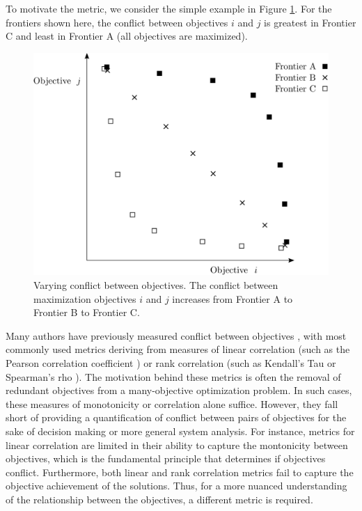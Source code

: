 To motivate the metric, we consider the simple example in Figure \ref{fig:ConflictVariesExample}. For the frontiers shown here, the conflict between objectives $i$ and $j$ is greatest in Frontier C and least in Frontier A (all objectives are maximized).
\begin{figure}[ht]
\centering
\includegraphics[width=.6\textwidth]{../images/ConflictVariesExample}
\caption[Example of varying conflict between objectives]{Varying conflict between objectives. The conflict between maximization objectives $i$ and $j$ increases from Frontier A to Frontier B to Frontier C.}
\label{fig:ConflictVariesExample}
\end{figure}

Many authors have previously measured conflict between objectives \cite{brockhoff2009objective}\cite{purshouse2003conflict}\cite{gal1977redundant}, with most commonly used metrics deriving from measures of linear correlation (such as the Pearson correlation coefficient \cite{deb2006searching}) or rank correlation (such as Kendall's Tau \cite{kanoulas2009empirical} or Spearman's rho \cite{karande2012application}). The motivation behind these metrics is often the removal of redundant objectives from a many-objective optimization problem. In such cases, these measures of monotonicity or correlation alone suffice. However, they fall short of providing a quantification of conflict between pairs of objectives for the sake of decision making or more general system analysis. For instance, metrics for linear correlation are limited in their ability to capture the montonicity between objectives, which is the fundamental principle that determines if objectives conflict. Furthermore, both linear and rank correlation metrics fail to capture the objective achievement of the solutions. Thus, for a more nuanced understanding of the relationship between the objectives, a different metric is required.

